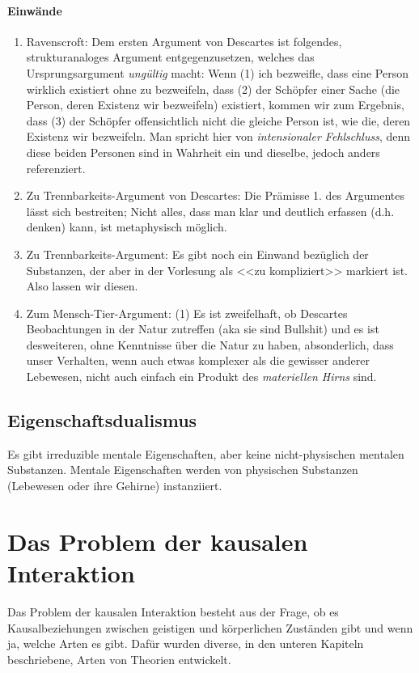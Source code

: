 \documentclass[../main.tex]{subfiles}
\begin{document}
\paragraph{Einwände}
\begin{enumerate}
	\item Ravenscroft: Dem ersten Argument von Descartes ist folgendes, strukturanaloges Argument entgegenzusetzen, welches das Ursprungsargument \textit{ungültig} macht: Wenn (1) ich bezweifle, dass eine Person wirklich existiert ohne zu bezweifeln, dass (2) der Schöpfer einer Sache (die Person, deren Existenz wir bezweifeln) existiert, kommen wir zum Ergebnis, dass (3) der Schöpfer offensichtlich nicht die gleiche Person ist, wie die, deren Existenz wir bezweifeln. Man spricht hier von \textit{intensionaler Fehlschluss}, denn diese beiden Personen sind in Wahrheit ein und dieselbe, jedoch anders referenziert. 
	\item Zu Trennbarkeits-Argument von Descartes: Die Prämisse 1. des Argumentes lässt sich bestreiten; Nicht alles, dass man klar und deutlich erfassen (d.h. denken) kann, ist metaphysisch möglich.
	\item Zu Trennbarkeits-Argument: Es gibt noch ein Einwand bezüglich der Substanzen, der aber in der Vorlesung als <<zu kompliziert>> markiert ist. Also lassen wir diesen. 	
	\item Zum Mensch-Tier-Argument: (1) Es ist zweifelhaft, ob Descartes Beobachtungen in der Natur zutreffen (aka sie sind Bullshit) und es ist desweiteren, ohne Kenntnisse über die Natur zu haben, absonderlich, dass unser Verhalten, wenn auch etwas komplexer als die gewisser anderer Lebewesen, nicht auch einfach ein Produkt des \textit{materiellen Hirns} sind. 
\end{enumerate}

\subsection{Eigenschaftsdualismus}
Es gibt irreduzible mentale Eigenschaften, aber keine nicht-physischen mentalen Substanzen. Mentale Eigenschaften werden von physischen Substanzen (Lebewesen oder ihre Gehirne) instanziiert.

\section{Das Problem der kausalen Interaktion}
Das Problem der kausalen Interaktion besteht aus der Frage, ob es Kausalbeziehungen zwischen geistigen und körperlichen Zuständen gibt und wenn ja, welche Arten es gibt. Dafür wurden diverse, in den unteren Kapiteln beschriebene, Arten von Theorien entwickelt. 
\end{document}
